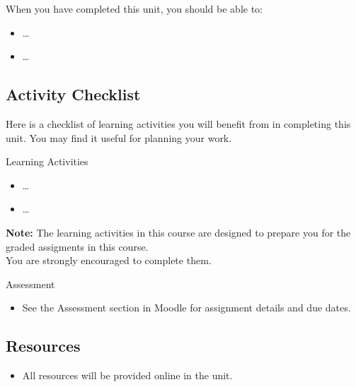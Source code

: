 \documentclass[
]{book}
\providecommand{\tightlist}{%
  \setlength{\itemsep}{0pt}\setlength{\parskip}{0pt}}
\theoremstyle{definition}
\theoremstyle{definition}
\theoremstyle{definition}
\theoremstyle{definition}
\theoremstyle{remark}
\begin{document}
When you have completed this unit, you should be able to:

\begin{itemize}
\tightlist
\item
  \ldots{}
\item
  \ldots{}
\end{itemize}

\hypertarget{activity-checklist-4}{%
\subsection*{Activity Checklist}\label{activity-checklist-4}}

Here is a checklist of learning activities you will benefit from in completing this unit. You may find it useful for planning your work.

\begin{reflect}
{Learning Activities}

\begin{itemize}
\tightlist
\item
  \ldots{}
\item
  \ldots{}
\end{itemize}

\textbf{Note:} The learning activities in this course are designed to prepare you for the graded assigments in this course.\\
You are strongly encouraged to complete them.
\end{reflect}

\begin{assessment}
{Assessment}

\begin{itemize}
\tightlist
\item
  See the Assessment section in Moodle for assignment details and due dates.
\end{itemize}
\end{assessment}

\hypertarget{resources-4}{%
\subsection*{Resources}\label{resources-4}}

\begin{itemize}
\tightlist
\item
  All resources will be provided online in the unit.
\end{itemize}
\end{document}
